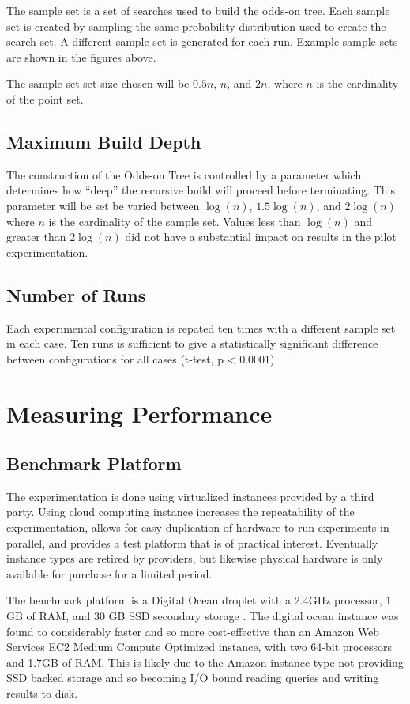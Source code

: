 \documentclass[mcs]{scsthesis}
\begin{document}
The sample set is a set of searches used to build the odds-on tree. Each sample
set is created by sampling the same probability distribution used to create the
search set. A different sample set is generated for each run. Example sample
sets are shown in the figures above.

The sample set set size chosen will be $0.5n$, $n$, and $2n$, where
$n$ is the cardinality of the point set.

\subsection{Maximum Build Depth}

The construction of the Odds-on Tree is controlled by a parameter which
determines how ``deep'' the recursive build will proceed before terminating.
This parameter will be set be varied between $\log(n)$, $1.5\log(n)$, and
$2\log(n)$ where $n$ is the cardinality of the sample set. Values less than
$\log(n)$ and greater than $2\log(n)$ did not have a substantial impact on
results in the pilot experimentation. 

\subsection{Number of Runs}

Each experimental configuration is repated ten times with a different sample set 
in each case. Ten runs is sufficient to give a statistically significant
difference between configurations for all cases (t-test, p < 0.0001).

\section{Measuring Performance}

\subsection{Benchmark Platform}

The experimentation is done using virtualized instances provided by a third
party. Using cloud computing instance increases the repeatability of the
experimentation, allows for easy duplication of hardware to run experiments in
parallel, and provides a test platform that is of practical interest. Eventually
instance types are retired by providers, but likewise physical hardware is only
available for purchase for a limited period.

The benchmark platform is a Digital Ocean droplet with a 2.4GHz processor, 1 GB
of RAM, and 30 GB SSD secondary storage \cite{digitalocean}. The digital ocean
instance was found to considerably faster and so more cost-effective than an
Amazon Web Services EC2 Medium Compute Optimized instance, with two 64-bit
processors and 1.7GB of RAM. This is likely due to the Amazon instance type
not providing SSD backed storage and so becoming I/O bound reading queries and
writing results to disk.
\end{document}
